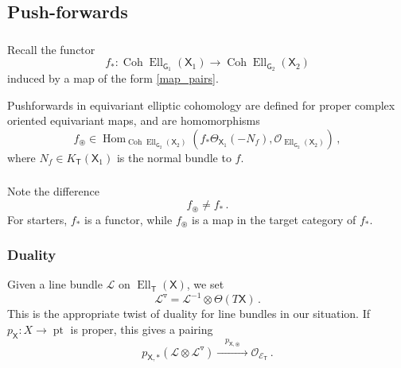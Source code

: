 \documentclass[14pt]{extarticle}
\newcommand{\bT}{\mathsf{T}}
\newcommand{\bG}{\mathsf{G}}
\newcommand{\bX}{\mathsf{X}}
\newcommand{\cL}{\mathscr{L}}
\newcommand{\cE}{\mathscr{E}}
\newcommand{\cO}{\mathscr{O}}
\newcommand{\ppf}{{\circledast}}
\newcommand{\pf}{_{\ppf}}
\newcommand{\dd}{\triangledown}
\DeclareMathOperator{\Coh}{Coh}
\DeclareMathOperator{\Hom}{Hom}
\DeclareMathOperator{\Ker}{Ker}
\DeclareMathOperator{\Ell}{Ell}
\DeclareMathOperator{\pt}{pt}
\theoremstyle{definition}
\begin{document}
\subsection{Push-forwards}

\subsubsection{}\label{s_push}

Recall the functor
%
\begin{equation}
  \label{f_*}
f_*: \Coh \Ell_{\bG_1}(\bX_1) \to  \Coh \Ell_{\bG_2}(\bX_2)
\end{equation}
%
induced by a map of the form \eqref{map_pairs}.




Pushforwards in equivariant elliptic cohomology are defined for proper complex
oriented equivariant maps, and are homomorphisms
%
\begin{equation}
f\pf \in \Hom_{\Coh \Ell_{\bG_2}(\bX_2)}
(f_* \Theta_{\bX_1}(-N_f),\cO_{\Ell_{\bG_2}(\bX_2)}) \label{fpf}
\,, 
\end{equation}
%
where $N_f \in K_\bT(\bX_1)$ is the normal bundle to $f$.
\subsubsection{} 

Note the 
difference
$$
f\pf \ne f_*  \,. 
$$
For starters, $f_*$ is a functor, while $f\pf$ is a map in
the target category of $f_*$.

\subsubsection{Duality}
Given a line bundle $\cL$ on $\Ell_\bT(\bX)$, we set
%
\begin{equation}
\cL^\dd = \cL^{-1} \otimes \Theta(T\bX) \,. \label{dd}
\end{equation}
%
This is the appropriate twist of duality for line bundles in our
situation. 
If $p_\bX: X \to \pt$ is proper, this gives a pairing
%
\begin{equation}
  \label{eq:12}
  p_{\bX,*}( \cL \otimes \cL^\dd )  \xrightarrow{\quad p_{\bX,\ppf} \quad}
  \cO_{\cE_\bT} \,. 
\end{equation}
\end{document}
